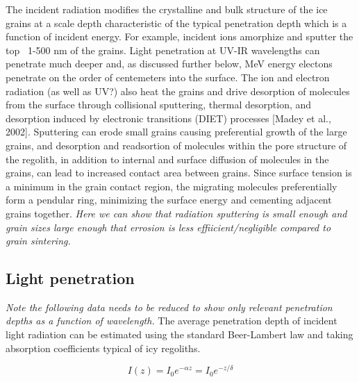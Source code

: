\documentclass[11pt]{article} %
\begin{document}
	The incident radiation modifies the crystalline and bulk structure of the ice grains at a scale depth characteristic of the typical penetration depth which is a function of incident energy. For example, incident ions amorphize and sputter the top ~1-500 nm of the grains. Light penetration at UV-IR wavelengths can penetrate much deeper and, as discussed further below, MeV energy electons penetrate on the order of centemeters into the surface. The ion and electron radiation (as well as UV?) also heat the grains and drive desorption of molecules from the surface through collisional sputtering, thermal desorption, and desorption induced by electronic transitions (DIET) processes [Madey et al., 2002]. Sputtering can erode small grains causing preferential growth of the large grains, and desorption and readsortion of molecules within the pore structure of the regolith, in addition to internal and surface diffusion of molecules in the grains, can lead to increased contact area between grains. Since surface tension is a minimum in the grain contact region, the migrating molecules preferentially form a pendular ring, minimizing the surface energy and cementing adjacent grains together. \emph{Here we can show that radiation sputtering is small enough and grain sizes large enough that errosion is less effiicient/negligible compared to grain sintering.}


\subsection{Light penetration}
	\emph{Note the following data needs to be reduced to show only relevant penetration depths as a function of wavelength.} The average penetration depth of incident light radiation can be estimated using the standard Beer-Lambert law and taking absorption coefficients typical of icy regoliths.  

	\begin{equation}
	I(z) = I_{0}e^{-\alpha z} = I_{0}e^{-z/\delta}
	\end{equation}
	
\end{document}
